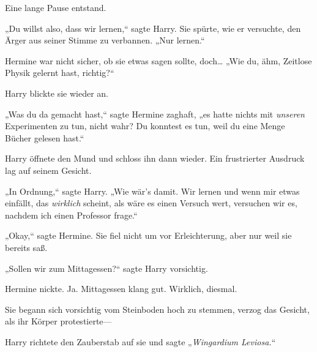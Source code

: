 Eine lange Pause entstand.

„Du willst also, dass wir lernen,“ sagte Harry. Sie spürte, wie er versuchte, den Ärger aus seiner Stimme zu verbannen. „Nur lernen.“

Hermine war nicht sicher, ob sie etwas sagen sollte, doch… „Wie du, ähm, Zeitlose Physik gelernt hast, richtig?“

Harry blickte sie wieder an.

„Was du da gemacht hast,“ sagte Hermine zaghaft, „es hatte nichts mit \emph{unseren} Experimenten zu tun, nicht wahr? Du konntest es tun, weil du eine Menge Bücher gelesen hast.“

Harry öffnete den Mund und schloss ihn dann wieder. Ein frustrierter Ausdruck lag auf seinem Gesicht.

„In Ordnung,“ sagte Harry. „Wie wär’s damit. Wir lernen und wenn mir etwas einfällt, das \emph{wirklich} scheint, als wäre es einen Versuch wert, versuchen wir es, nachdem ich einen Professor frage.“

„Okay,“ sagte Hermine. Sie fiel nicht um vor Erleichterung, aber nur weil sie bereits saß.

„Sollen wir zum Mittagessen?“ sagte Harry vorsichtig.

Hermine nickte. Ja. Mittagessen klang gut. Wirklich, diesmal.

Sie begann sich vorsichtig vom Steinboden hoch zu stemmen, verzog das Gesicht, als ihr Körper protestierte—

Harry richtete den Zauberstab auf sie und sagte „\emph{Wingardium Leviosa.}“

